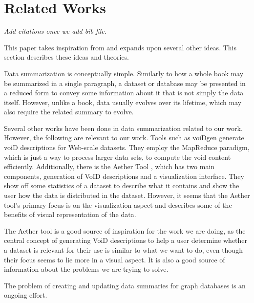 \section{Related Works}\label{sec:related-works}
\emph{Add citations once we add bib file.}

This paper takes inspiration from and expands upon several other ideas. This section describes these ideas and theories.

Data summarization is conceptually simple. Similarly to how a whole book may be summarized in a single paragraph, a dataset or database may be presented in a reduced form to convey some information about it that is not simply the data itself. However, unlike a book, data usually evolves over its lifetime, which may also require the related summary to evolve.

Several other works have been done in data summarization related to our work. However, the following are relevant to our work. Tools such as voiDgen\cite{creatingVoidDescriptions} generate voiD descriptions for Web-scale datasets. They employ the MapReduce paradigm, which is just a way to process larger data sets\cite{MapReduceParadigm}, to compute the void content efficiently.
Additionally, there is the Aether Tool \cite{AetherTool}, which has two main components, generation of VoID descriptions and a visualization interface. They show off some statistics of a dataset to describe what it contains and show the user how the data is distributed in the dataset. However, it seems that the Aether tool's primary focus is on the visualization aspect and describes some of the benefits of visual representation of the data. 

The Aether tool is a good source of inspiration for the work we are doing, as the central concept of generating VoiD descriptions to help a user determine whether a dataset is relevant for their use is similar to what we want to do, even though their focus seems to lie more in a visual aspect. It is also a good source of information about the problems we are trying to solve. 

The problem of creating and updating data summaries for graph databases is an ongoing effort.



